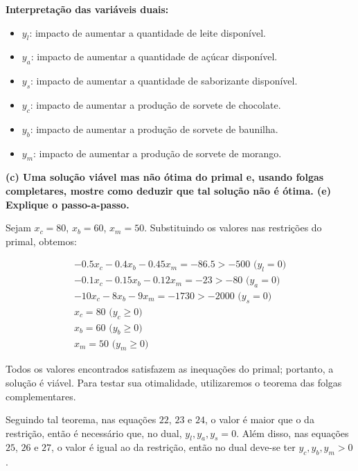 \documentclass[
    12pt,
    a4paper,
    brazil,
    english
]{article}
\begin{document}
\textbf{Interpretação das variáveis duais:}

\begin{itemize}
    \item $y_l$: impacto de aumentar a quantidade de leite disponível.
    \item $y_a$: impacto de aumentar a quantidade de açúcar disponível.
    \item $y_s$: impacto de aumentar a quantidade de saborizante disponível.
    \item $y_c$: impacto de aumentar a produção de sorvete de chocolate.
    \item $y_b$: impacto de aumentar a produção de sorvete de baunilha.
    \item $y_m$: impacto de aumentar a produção de sorvete de morango.
\end{itemize}

\vspace{0.5cm}

\textbf{(c) Uma solução viável mas não ótima do primal e, usando folgas completares, mostre como
deduzir que tal solução não é ótima. (e) Explique o passo-a-passo.}

\vspace{0.5cm}

Sejam $x_c = 80$, $x_b = 60$, $x_m = 50$. Substituindo os valores nas restrições do primal, obtemos:

\begin{align}
        -0.5x_c - 0.4x_b - 0.45x_m  = -86.5 > -500 \text{ (}y_l = 0\text{)} \\
        -0.1x_c - 0.15x_b - 0.12x_m  = -23 > -80 \text{ (}y_a = 0\text{)} \\
        -10x_c - 8x_b - 9x_m  = -1730 > -2000 \text{ (}y_s = 0\text{)} \\
    x_c = 80 \text{ (}y_c \geq 0\text{)} \\
    x_b = 60 \text{ (}y_b \geq 0\text{)} \\
    x_m = 50 \text{ (}y_m \geq 0\text{)}
\end{align}

Todos os valores encontrados satisfazem as inequações do primal; portanto, a solução é viável. Para testar sua otimalidade, utilizaremos o teorema das folgas complementares. 

Seguindo tal teorema, nas equações $22$, $23$ e $24$, o valor é maior que o da restrição, então é necessário que, no dual, $y_l, y_a, y_s = 0$. Além disso, nas equações $25$, $26$ e $27$, o valor é igual ao da restrição, então no dual deve-se ter $y_c, y_b, y_m > 0$.
\end{document}
